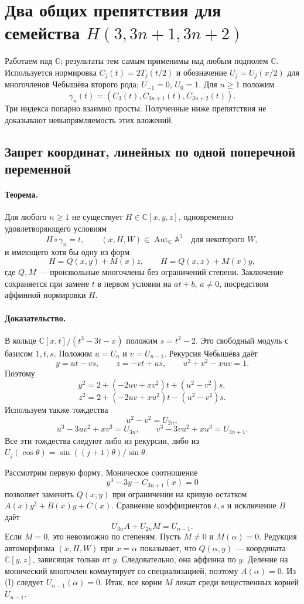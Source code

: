 \section{Два общих препятствия для семейства $H(3,3n+1,3n+2)$}

Работаем над $\mathbb C$; результаты тем самым применимы над любым
подполем $\mathbb C$. Используется нормировка
$C_j(t)=2T_j(t/2)$ и обозначение $U_j=U_j(x/2)$ для многочленов
Чебышёва второго рода; $U_{-1}=0$, $U_0=1$.
Для $n\geq1$ положим
\[
 \gamma_n(t)=(C_3(t),C_{3n+1}(t),C_{3n+2}(t)).
\]
Три индекса попарно взаимно просты. Полученные ниже препятствия
не доказывают невыпрямляемость этих вложений.

\subsection{Запрет координат, линейных по одной поперечной переменной}

\paragraph{Теорема.}
Для любого $n\geq1$ не существует $H\in\mathbb C[x,y,z]$, одновременно
удовлетворяющего условиям
\[
 H\circ\gamma_n=t,\qquad
 (x,H,W)\in\operatorname{Aut}_{\mathbb C}\mathbb A^3
 \quad\text{для некоторого }W,
\]
и имеющего хотя бы одну из форм
\[
 H=Q(x,y)+M(x)z,\qquad H=Q(x,z)+M(x)y,
\]
где $Q,M$ --- произвольные многочлены без ограничений степени.
Заключение сохраняется при замене $t$ в первом условии на $at+b$,
$a\ne0$, посредством аффинной нормировки $H$.

\paragraph{Доказательство.}
В кольце $\mathbb C[x,t]/(t^3-3t-x)$ положим $s=t^2-2$.
Это свободный модуль с базисом $1,t,s$. Положим
$u=U_n$ и $v=U_{n-1}$. Рекурсия Чебышёва даёт
\[
 y=ut-vs,\qquad z=-vt+us,\qquad
 u^2+v^2-xuv=1.
\]
Поэтому
\[
 y^2=2+(-2uv+xv^2)t+(u^2-v^2)s,
\]
\[
 z^2=2+(-2uv+xu^2)t-(u^2-v^2)s.
\]
Используем также тождества
\[
 u^2-v^2=U_{2n},
\]
\[
 u^3-3uv^2+xv^3=U_{3n},\qquad
 v^3-3vu^2+xu^3=U_{3n+1}.
\]
Все эти тождества следуют либо из рекурсии, либо из
$U_j(\cos\theta)=\sin((j+1)\theta)/\sin\theta$.

Рассмотрим первую форму. Моническое соотношение
\[
 y^3-3y-C_{3n+1}(x)=0
\]
позволяет заменить $Q(x,y)$ при ограничении на кривую остатком
$A(x)y^2+B(x)y+C(x)$. Сравнение коэффициентов $t,s$ и исключение
$B$ даёт
\[
 \boxed{U_{3n}A+U_{2n}M=U_{n-1}.} \tag{I}
\]
Если $M=0$, это невозможно по степеням. Пусть $M\ne0$ и
$M(\alpha)=0$. Редукция автоморфизма $(x,H,W)$ при $x=\alpha$
показывает, что $Q(\alpha,y)$ --- координата $\mathbb C[y,z]$,
зависящая только от $y$. Следовательно, она аффинна по $y$.
Деление на монический многочлен коммутирует со специализацией,
поэтому $A(\alpha)=0$. Из (I) следует $U_{n-1}(\alpha)=0$.
Итак, все корни $M$ лежат среди вещественных корней $U_{n-1}$.

